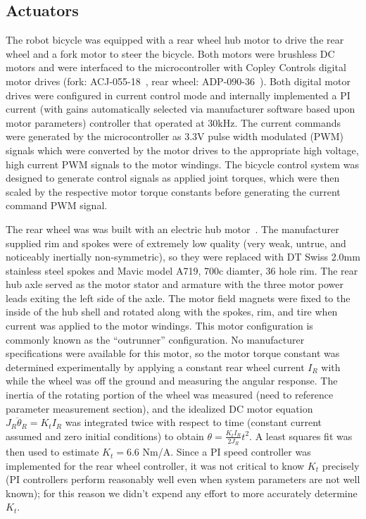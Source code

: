 \subsection{Actuators} \label{rb:subsec:actuators}
The robot bicycle was equipped with a rear wheel hub motor to drive the rear
wheel and a fork motor to steer the bicycle. Both motors were brushless DC
motors and were interfaced to the microcontroller with Copley Controls digital
motor drives (fork: ACJ-055-18~\cite{CopleyACJ}, rear wheel:
ADP-090-36~\cite{CopleyADP}). Both digital motor drives were configured in
current control mode and internally implemented a PI current (with gains
automatically selected via manufacturer software based upon motor parameters)
controller that operated at 30kHz. The current commands were generated by the
microcontroller as 3.3V pulse width modulated (PWM) signals which were
converted by the motor drives to the appropriate high voltage, high current PWM
signals to the motor windings. The bicycle control system was designed to
generate control signals as applied joint torques, which were then scaled by
the respective motor torque constants before generating the current command PWM
signal.

The rear wheel was was built with an electric hub motor~\cite{AmpedBikes}. The
manufacturer supplied rim and spokes were of extremely low quality (very weak,
untrue, and noticeably inertially non-symmetric), so they were replaced with DT
Swiss 2.0mm stainless steel spokes and Mavic model A719, 700c diamter, 36 hole
rim. The rear hub axle served as the motor stator and armature with the three
motor power leads exiting the left side of the axle. The motor field magnets
were fixed to the inside of the hub shell and rotated along with the spokes,
rim, and tire when current was applied to the motor windings. This motor
configuration is commonly known as the ``outrunner'' configuration. No
manufacturer specifications were available for this motor, so the motor torque
constant was determined experimentally by applying a constant rear wheel
current $I_R$ with while the wheel was off the ground and measuring the angular
response. The inertia of the rotating portion of the wheel was measured (need
to reference parameter measurement section), and the idealized DC motor
equation $J_R\ddot{\theta}_R = K_t I_R$ was integrated twice with respect to
time (constant current assumed and zero initial conditions) to obtain $\theta =
\frac{K_t I_R}{2J_R}t^2$. A least squares fit was then used to estimate
$K_t=6.6$ Nm/A. Since a PI speed controller was implemented for the rear wheel
controller, it was not critical to know $K_t$ precisely (PI controllers perform
reasonably well even when system parameters are not well known); for this
reason we didn't expend any effort to more accurately determine $K_t$.

